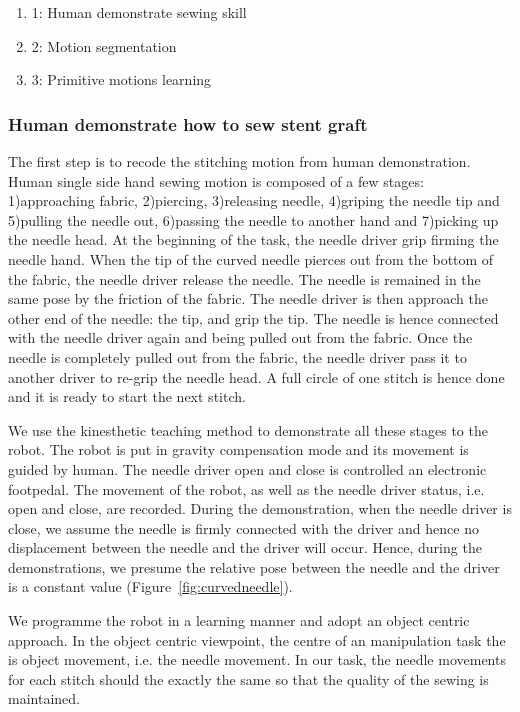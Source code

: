 \begin{enumerate}
\item{1}: Human demonstrate sewing skill
\item{2}: Motion segmentation
\item{3}: Primitive motions learning
\end{enumerate}

\subsubsection{Human demonstrate how to sew stent graft}
The first step is to recode the stitching motion from human demonstration. Human single side hand sewing motion is composed of a few stages: 1)approaching fabric, 2)piercing, 3)releasing needle, 4)griping the needle tip and 5)pulling the needle out, 6)passing the needle to another hand and 7)picking up the needle head. At the beginning of the task, the needle driver grip firming the needle hand. When the tip of the curved needle pierces out from the bottom of the fabric, the needle driver release the needle. The needle is remained in the same pose by the friction of the fabric. The needle driver is then approach the other end of the needle: the tip, and grip the tip. The needle is hence connected with the needle driver again and being pulled out from the fabric. Once the needle is completely pulled out from the fabric, the needle driver pass it to another driver to re-grip the needle head. A full circle of one stitch is hence done and it is ready to start the next stitch.

We use the kinesthetic teaching method to demonstrate all these stages to the robot. The robot is put in gravity compensation mode and its movement is guided by human. The needle driver open and close is controlled an electronic footpedal. The movement of the robot, as well as the needle driver status, i.e. open and close, are recorded. During the demonstration, when the needle driver is close, we assume the needle is firmly connected with the driver and hence no displacement between the needle and the driver will occur. Hence, during the demonstrations, we presume the relative pose between the needle and the driver is a constant value (Figure~\ref{fig:curvedneedle}).

We programme the robot in a learning manner and adopt an object centric approach. In the object centric viewpoint, the centre of an manipulation task the is object movement, i.e. the needle movement. In our task, the needle movements for each stitch should the exactly the same so that the quality of the sewing is maintained.

